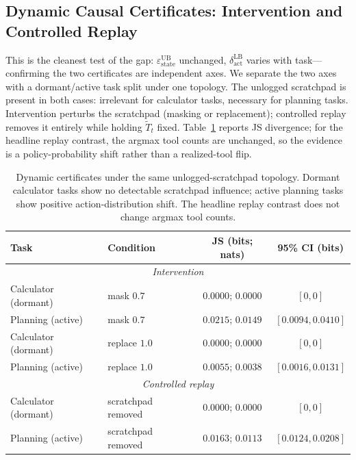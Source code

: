 \documentclass{article}
\begin{document}
\subsection{Dynamic Causal Certificates: Intervention and Controlled Replay}
\label{sec:exp-intervention}

This is the cleanest test of the gap: $\varepsilon_\text{state}^\text{UB}$ unchanged, $\delta_\text{act}^\text{LB}$ varies with task---confirming the two certificates are independent axes. We separate the two axes with a dormant/active task split under one topology. The unlogged scratchpad is present in both cases: irrelevant for calculator tasks, necessary for planning tasks. Intervention perturbs the scratchpad (masking or replacement); controlled replay removes it entirely while holding $\tilde T_t$ fixed. Table~\ref{tab:dynamic-certs} reports JS divergence; for the headline replay contrast, the argmax tool counts are unchanged, so the evidence is a policy-probability shift rather than a realized-tool flip.

\begin{table}[t]
\centering
\begin{tabular}{llcc}
\toprule
Task & Condition & JS (bits; nats) & 95\% CI (bits) \\
\midrule
\multicolumn{4}{c}{\textit{Intervention}} \\
Calculator (dormant) & mask $0.7$ & $0.0000$; $0.0000$ & $[0,0]$ \\
Planning (active) & mask $0.7$ & $0.0215$; $0.0149$ & $[0.0094,0.0410]$ \\
Calculator (dormant) & replace $1.0$ & $0.0000$; $0.0000$ & $[0,0]$ \\
Planning (active) & replace $1.0$ & $0.0055$; $0.0038$ & $[0.0016,0.0131]$ \\
\multicolumn{4}{c}{\textit{Controlled replay}} \\
Calculator (dormant) & scratchpad removed & $0.0000$; $0.0000$ & $[0,0]$ \\
Planning (active) & scratchpad removed & $0.0163$; $0.0113$ & $[0.0124,0.0208]$ \\
\bottomrule
\end{tabular}
\caption{Dynamic certificates under the same unlogged-scratchpad topology. Dormant calculator tasks show no detectable scratchpad influence; active planning tasks show positive action-distribution shift. The headline replay contrast does not change argmax tool counts.}
\label{tab:dynamic-certs}
\end{table}
\end{document}

